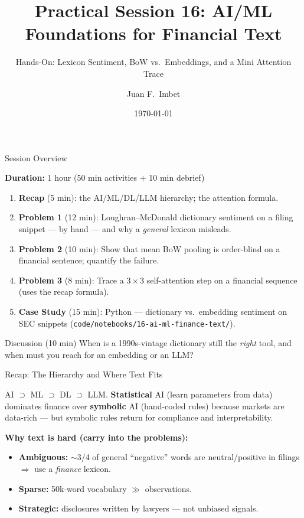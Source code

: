 \documentclass[9pt,t]{beamer}
\title{Practical Session 16: AI/ML Foundations for Financial Text}
\subtitle{Hands-On: Lexicon Sentiment, BoW vs.\ Embeddings, and a Mini Attention Trace}
\author{Juan F.\ Imbet}
\institute{Paris Dauphine -- PSL University}
\date{\today}
\begin{document}
\begin{frame}\titlepage\end{frame}

\begin{frame}{Session Overview}

\textbf{Duration:} 1 hour (50 min activities + 10 min debrief)

\medskip
\begin{enumerate}
  \item \textbf{Recap} (5 min): the AI/ML/DL/LLM hierarchy; the attention formula.
  \item \textbf{Problem 1} (12 min): Loughran--McDonald dictionary sentiment on a
        filing snippet --- by hand --- and why a \emph{general} lexicon misleads.
  \item \textbf{Problem 2} (10 min): Show that mean BoW pooling is order-blind on
        a financial sentence; quantify the failure.
  \item \textbf{Problem 3} (8 min): Trace a $3\times3$ self-attention step on a
        financial sequence (uses the recap formula).
  \item \textbf{Case Study} (15 min): Python --- dictionary vs.\ embedding sentiment on
        SEC snippets (\texttt{code/notebooks/16-ai-ml-finance-text/}).
\end{enumerate}

\medskip
\begin{block}{Discussion (10 min)}
When is a 1990s-vintage dictionary still the \emph{right} tool, and when must you
reach for an embedding or an LLM?
\end{block}
\end{frame}

\begin{frame}{Recap: The Hierarchy and Where Text Fits}

\begin{bigpicture}
AI $\supset$ ML $\supset$ DL $\supset$ LLM. \textbf{Statistical} AI (learn
parameters from data) dominates finance over \textbf{symbolic} AI (hand-coded
rules) because markets are data-rich --- but symbolic rules return for compliance
and interpretability.
\end{bigpicture}

\medskip
\textbf{Why text is hard (carry into the problems):}
\begin{itemize}
  \item \textbf{Ambiguous:} $\sim$3/4 of general ``negative'' words are
        neutral/positive in filings $\Rightarrow$ use a \emph{finance} lexicon.
  \item \textbf{Sparse:} 50k-word vocabulary $\gg$ observations.
  \item \textbf{Strategic:} disclosures written by lawyers --- not unbiased signals.
\end{itemize}
\end{frame}
\end{document}

